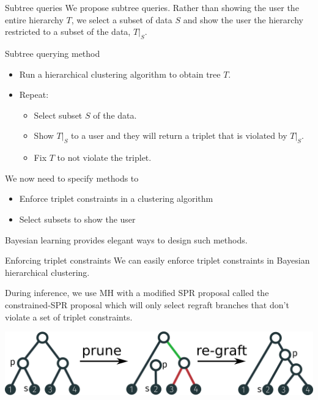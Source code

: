 \documentclass[10pt, compress]{beamer}
\begin{document}
\begin{frame}{Subtree queries}
  We propose \alert{subtree queries}. Rather than showing
  the user the entire hierarchy $T$, we select a subset of data $S$
  and show the user the hierarchy
  restricted to a subset of the data, $T|_S$.

  \pause

  \begin{block}{Subtree querying method}
  \begin{itemize}
    \item Run a hierarchical clustering algorithm to obtain tree $T$.
    \item Repeat:
      \begin{itemize}
        \item Select subset $S$ of the data.
        \item Show $T|_S$ to a user 
          and they will return a triplet that is violated by $T|_S$.
        \item Fix $T$ to not violate the triplet.
      \end{itemize}
  \end{itemize}
  \end{block}

  \pause
  We now need to specify methods to
  \begin{itemize}
    \item Enforce triplet constraints in a clustering algorithm
    \item Select subsets to show the user
  \end{itemize}
  Bayesian learning provides
  elegant ways to design such methods.
\end{frame}


\begin{frame}{Enforcing triplet constraints}
  We can easily enforce triplet constraints
  in Bayesian hierarchical clustering.

  During inference, we use MH with a modified SPR proposal called
  the constrained-SPR proposal which will
  only select regraft branches
  that don't violate a set of
  triplet constraints.

    \pause

  \begin{center}
    \includegraphics[width=\textwidth]{img/cspr-animation}
  \end{center}
\end{frame}
\end{document}
